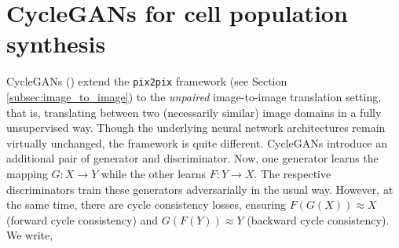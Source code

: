 %

\section{CycleGANs for cell population synthesis}
\label{sec:cycle_gans}

CycleGANs (\cite{isola2017image}) extend the \texttt{pix2pix} framework (see Section \ref{subsec:image_to_image}) to the \emph{unpaired} image-to-image translation setting, that is, translating between two (necessarily similar) image domains in a fully unsupervised way. Though the underlying neural network architectures remain virtually unchanged, the framework is quite different. CycleGANs introduce an additional pair of generator and discriminator. Now, one generator learns the mapping $G : X \to Y$ while the other learns $F : Y \to X$. The respective discriminators train these generators adversarially in the usual way. However, at the same time, there are cycle consistency losses, ensuring $F(G(X)) \approx X$ (forward cycle consistency) and $G(F(Y)) \approx Y$ (backward cycle consistency). We write,

